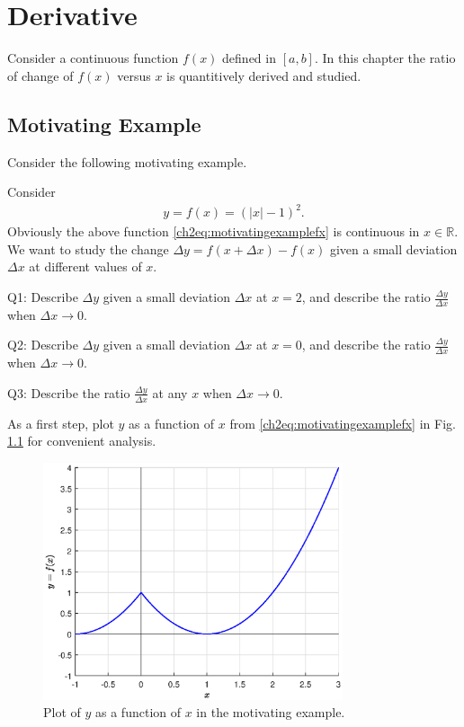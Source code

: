 \chapter{Derivative} \label{ch:derivative}

Consider a continuous function $f(x)$ defined in $\left[a,b\right]$. In this chapter the ratio of change of $f(x)$ versus $x$ is quantitively derived and studied.

\section{Motivating Example}

Consider the following motivating example.

\begin{shortbox}

Consider
\begin{eqnarray}
  y = f(x) = \left(|x|-1\right)^2. \label{ch2eq:motivatingexamplefx}
\end{eqnarray}
Obviously the above function \eqref{ch2eq:motivatingexamplefx} is continuous in $x\in\mathbb{R}$. We want to study the change $\Delta y = f\left(x+\Delta x\right) - f(x)$ given a small deviation $\Delta x$ at different values of $x$.

Q1: Describe $\Delta y$ given a small deviation $\Delta x$ at $x=2$, and describe the ratio $\frac{\Delta y}{\Delta x}$ when $\Delta x \rightarrow 0$.

Q2: Describe $\Delta y$ given a small deviation $\Delta x$ at $x=0$, and describe the ratio $\frac{\Delta y}{\Delta x}$ when $\Delta x \rightarrow 0$.

Q3: Describe the ratio $\frac{\Delta y}{\Delta x}$ at any $x$ when $\Delta x \rightarrow 0$.
\end{shortbox}

As a first step, plot $y$ as a function of $x$ from \eqref{ch2eq:motivatingexamplefx} in Fig. \ref{ch2fig:fxsimpleexample} for convenient analysis.
\begin{figure}
\centering
\includegraphics[width=250pt]{chapters/part-1/figures/fig_derivative_motiexp.eps}
\caption{Plot of $y$ as a function of $x$ in the motivating example.} \label{ch2fig:fxsimpleexample}
\end{figure}

